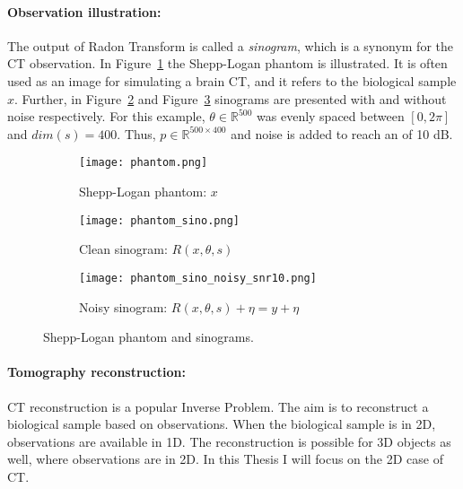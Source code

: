 \paragraph{Observation illustration:}

The output of Radon Transform is called a \textit{sinogram}, which is a synonym for the CT observation.
In Figure~\ref{fig:phantom} the Shepp-Logan phantom is illustrated.
It is often used as an image for simulating a brain CT, and it refers to the biological sample $x$. 
Further, in Figure~\ref{fig:phantom_sinogram} and Figure~\ref{fig:phantom_sinogram_noisy} 
sinograms are presented with and without noise respectively. 
For this example, $\theta \in \mathbb{R}^{500}$ was evenly spaced
between $[0, 2 \pi]$ and $dim(s) = 400$. 
Thus, $p \in \mathbb{R}^{500 \times 400}$ and noise is added to reach an \snry of 10 dB.

\begin{figure}[H]
    \captionsetup[subfigure]{justification=centering}
    \centering
    \begin{subfigure}[t]{0.3\textwidth}
        \texttt{[image: phantom.png]}
        \caption{Shepp-Logan phantom: $x$}
        \label{fig:phantom}
    \end{subfigure}\hfill
    \begin{subfigure}[t]{0.3\textwidth}
      \texttt{[image: phantom\_sino.png]}
      \caption{Clean sinogram: $R(x, \theta, s)$}
      \label{fig:phantom_sinogram}
    \end{subfigure}\hfill
    \begin{subfigure}[t]{0.3\textwidth}
      \texttt{[image: phantom\_sino\_noisy\_snr10.png]}
      \caption{Noisy sinogram: $R(x, \theta, s) + \eta = y + \eta$}
      \label{fig:phantom_sinogram_noisy}
    \end{subfigure}
    \caption{Shepp-Logan phantom and sinograms.}
    \label{fig:phantom_and_sinos}
  \end{figure}


\paragraph{Tomography reconstruction:}

CT reconstruction is a popular Inverse Problem. 
The aim is to reconstruct a biological sample based on observations.
When the biological sample is in 2D, observations are available in 1D. 
The reconstruction is possible for 3D objects as well, where observations are in 2D.
In this Thesis I will focus on the 2D case of CT.


